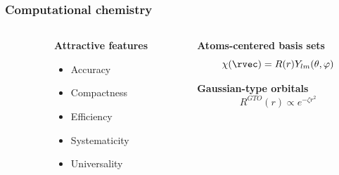 \begin{frame}
    \frametitle{Computational chemistry}
    \begin{columns}
    \begin{column}{.10\textwidth}
    \end{column}
    \begin{column}{.30\textwidth}
    \textbf{Attractive features}
    \begin{itemize}
        \item {\color{yellow} Accuracy}
        \item {\color{yellow} Compactness}
        \item {\color{green} Efficiency}
        \item {\color{yellow} Systematicity}
        \item {\color{red} Universality}
    \end{itemize}
    \end{column}
    \begin{column}{.60\textwidth}
    \centering
    \textbf{Atoms-centered basis sets}
    \begin{equation}
        \nonumber
        \chi(\rvec) = R(r)Y_{lm}(\theta,\varphi)
    \end{equation}
    
    \vspace{4.2mm}

    \textbf{Gaussian-type orbitals}
    \begin{equation}
        \nonumber
        R^{GTO}(r) \propto e^{-\zeta r^2}
    \end{equation}
    \end{column}
    \end{columns}    

    \vspace{5mm}


\end{frame}
